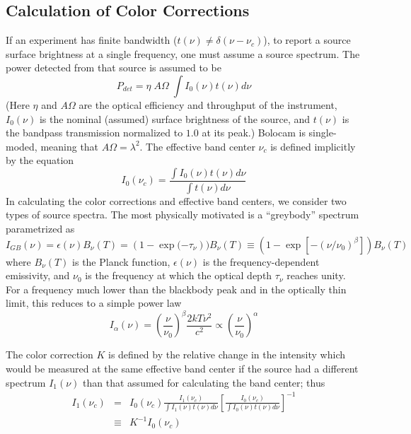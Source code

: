 \documentclass[12pt,preprint]{aastex}
\begin{document}
\begin{appendix}

\section{Calculation of Color Corrections}
\label{app:ColorCorrections}

If an experiment has finite bandwidth ($t(\nu) \ne \delta(\nu -
\nu_c)$), to report a source surface brightness at a single
frequency, one must assume a source spectrum.  The power detected from
that source is assumed to be
\begin{equation}
P_{det} = \eta \; A \Omega \; \int I_0(\nu) t(\nu) d \nu
\end{equation}
(Here $\eta$ and $A \Omega$ are the optical efficiency and throughput
of the instrument, $I_0(\nu)$ is the nominal (assumed) surface
brightness of the source, and $t(\nu)$ is the bandpass transmission
normalized to $1.0$ at its peak.)  Bolocam is single-moded, meaning
that $A \Omega = \lambda^2$.  The effective band center
$\nu_c$ is defined implicitly by the equation
\begin{equation}
\label{eq:BandCenter}
I_0(\nu_c) = \frac{\int I_0(\nu) t(\nu) d \nu}
{\int t(\nu) d \nu} 
\end{equation}
In calculating the color corrections and effective band centers, we
consider two types of source spectra.  The most physically motivated
is a ``greybody'' spectrum parametrized as
\begin{equation}
\label{eq:Greybody}
I_{GB}(\nu) = \epsilon(\nu) B_{\nu}(T)  =
(1-\exp{(-\tau_\nu})) B_{\nu}(T)
\equiv (1-\exp{[-(\nu/\nu_0)^\beta]}) B_{\nu}(T) 
\end{equation}
where $B_{\nu}(T)$ is the Planck function, $\epsilon(\nu)$ is the
frequency-dependent emissivity, and $\nu_0$ is the frequency at which
the optical depth $\tau_\nu$ reaches unity.  For a frequency much
lower than the blackbody peak and in the optically thin limit, this
reduces to a simple power law
\begin{equation}
\label{eq:PowerLaw}
I_\alpha(\nu) = \left(\frac{\nu}{\nu_0}\right)^\beta \frac{2kT\nu^2}{c^2}
\propto \left(\frac{\nu}{\nu_0}\right)^\alpha
\end{equation}

The color correction $K$ is defined by the relative change in the
intensity which would be measured at the same effective band center if
the source had a different spectrum $I_1(\nu)$ than that assumed for
calculating the band center; thus
\begin{eqnarray}
\label{eq:ColorCorrection}
\nonumber I_1(\nu_c) &=& I_0(\nu_c) \frac{I_1(\nu_c)}{\int I_1(\nu) t(\nu) d \nu} \left[\frac{I_0(\nu_c)}{\int I_0(\nu) t(\nu) d \nu} \right]^{-1} \\
&\equiv& K^{-1} I_0(\nu_c)
\end{eqnarray}


\end{appendix}
\end{document}
